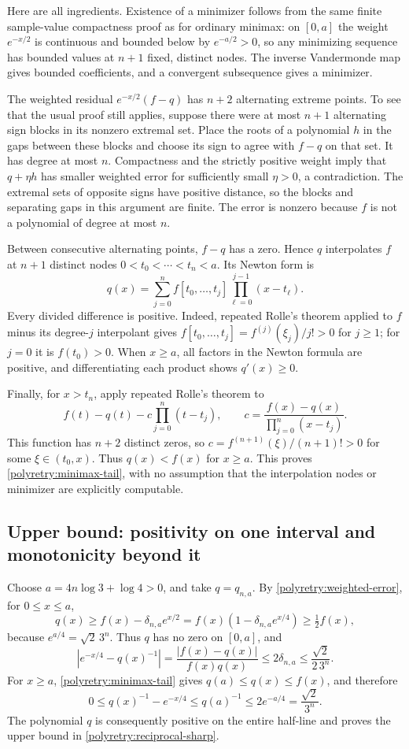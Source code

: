 \documentclass[11pt]{article}
\theoremstyle{remark}
\numberwithin{equation}{section}
\begin{document}
Here are all ingredients.  Existence of a minimizer follows from the
same finite sample-value compactness proof as for ordinary minimax:
on $[0,a]$ the weight $e^{-x/2}$ is continuous and bounded below by
$e^{-a/2}>0$, so any minimizing sequence has bounded values at $n+1$
fixed, distinct nodes.  The inverse Vandermonde map gives bounded
coefficients, and a convergent subsequence gives a minimizer.

The weighted residual $e^{-x/2}(f-q)$ has $n+2$ alternating extreme
points.  To see that the usual proof still applies, suppose there were
at most $n+1$ alternating sign blocks in its nonzero extremal set.
Place the roots of a polynomial $h$ in the gaps between these blocks
and choose its sign to agree with $f-q$ on that set.  It has degree at
most $n$.  Compactness and the strictly positive weight imply that
$q+\eta h$ has smaller weighted error for sufficiently small $\eta>0$,
a contradiction.  The extremal sets of opposite signs have positive
distance, so the blocks and separating gaps in this argument are
finite.  The error is nonzero because $f$ is not a polynomial of
degree at most $n$.

Between consecutive alternating points, $f-q$ has a zero.  Hence $q$
interpolates $f$ at $n+1$ distinct nodes
$0<t_0<\cdots<t_n<a$.  Its Newton form is
\[
 q(x)=\sum_{j=0}^n f[t_0,\ldots,t_j]
                 \prod_{\ell=0}^{j-1}(x-t_\ell).
\]
Every divided difference is positive.  Indeed, repeated Rolle's
theorem applied to $f$ minus its degree-$j$ interpolant gives
$f[t_0,\ldots,t_j]=f^{(j)}(\xi_j)/j!>0$ for $j\ge1$;
for $j=0$ it is $f(t_0)>0$.  When $x\ge a$, all factors in the
Newton formula are positive, and differentiating each product shows
$q'(x)\ge0$.

Finally, for $x>t_n$, apply repeated Rolle's theorem to
\[
 f(t)-q(t)-c\prod_{j=0}^n(t-t_j),\qquad
 c=\frac{f(x)-q(x)}{\prod_{j=0}^n(x-t_j)}.
\]
This function has $n+2$ distinct zeros, so
$c=f^{(n+1)}(\xi)/(n+1)!>0$ for some $\xi\in(t_0,x)$.
Thus $q(x)<f(x)$ for $x\ge a$.  This proves
\eqref{polyretry:minimax-tail}, with no assumption that the interpolation
nodes or minimizer are explicitly computable.

\subsection{Upper bound: positivity on one interval and monotonicity beyond it}
Choose $a=4n\log3+\log4>0$, and take $q=q_{n,a}$.
By \eqref{polyretry:weighted-error}, for $0\le x\le a$,
\[
 q(x)\ge f(x)-\delta_{n,a}e^{x/2}
 = f(x)(1-\delta_{n,a}e^{x/4})\ge\tfrac12f(x),
\]
because $e^{a/4}=\sqrt2\,3^n$.
Thus $q$ has no zero on $[0,a]$, and
\[
 |e^{-x/4}-q(x)^{-1}|
 =\frac{|f(x)-q(x)|}{f(x)q(x)}
 \le2\delta_{n,a}\le\frac{\sqrt2}{2\,3^n}.
\]
For $x\ge a$, \eqref{polyretry:minimax-tail} gives
$q(a)\le q(x)\le f(x)$, and therefore
\[
 0\le q(x)^{-1}-e^{-x/4}
 \le q(a)^{-1}\le2e^{-a/4}=\frac{\sqrt2}{3^n}.
\]
The polynomial $q$ is consequently positive on the entire half-line
and proves the upper bound in \eqref{polyretry:reciprocal-sharp}.
\end{document}
